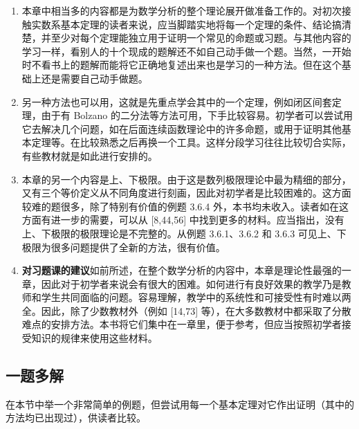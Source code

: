 \begin{enumerate}
  \item 本章中相当多的内容都是为数学分析的整个理论展开做准备工作的。对初次接触实数系基本定理的读者来说，应当脚踏实地将每一个定理的条件、结论搞清楚，并至少对每个定理能独立用于证明一个常见的命题或习题。与其他内容的学习一样，看别人的十个现成的题解还不如自己动手做一个题。当然，一开始时不看书上的题解而能将它正确地复述出来也是学习的一种方法。但在这个基础上还是需要自己动手做题。

  \item 另一种方法也可以用，这就是先重点学会其中的一个定理，例如闭区间套定理，由于有 Bolzano 的二分法等方法可用，下手比较容易。初学者可以尝试用它去解决几个问题，如在后面连续函数理论中的许多命题，或用于证明其他基本定理等。在比较熟悉之后再换一个工具。这样分段学习往往比较切合实际，有些教材就是如此进行安排的。

  \item 本章的另一个内容是上、下极限。由于这是数列极限理论中最为精细的部分，又有三个等价定义从不同角度进行刻画，因此对初学者是比较困难的。这方面较难的题很多，除了特别有价值的例题 3.6.4 外，本书均未收入。读者如在这方面有进一步的需要，可以从 [8,44,56] 中找到更多的材料。应当指出，没有上、下极限的极限理论是不完整的。从例题 3.6.1、3.6.2 和 3.6.3 可见上、下极限为很多问题提供了全新的方法，很有价值。

  \item \textbf{对习题课的建议}\quad 如前所述，在整个数学分析的内容中，本章是理论性最强的一章，因此对于初学者来说会有很大的困难。如何进行有良好效果的教学乃是教师和学生共同面临的问题。容易理解，教学中的系统性和可接受性有时难以两全。因此，除了少数教材外（例如 [14,73] 等），在大多数教材中都采取了分散难点的安排方法。本书将它们集中在一章里，便于参考，但应当按照初学者接受知识的规律来使用这些材料。
\end{enumerate}

\subsection{一题多解}

在本节中举一个非常简单的例题，但尝试用每一个基本定理对它作出证明（其中的方法均已出现过），供读者比较。

